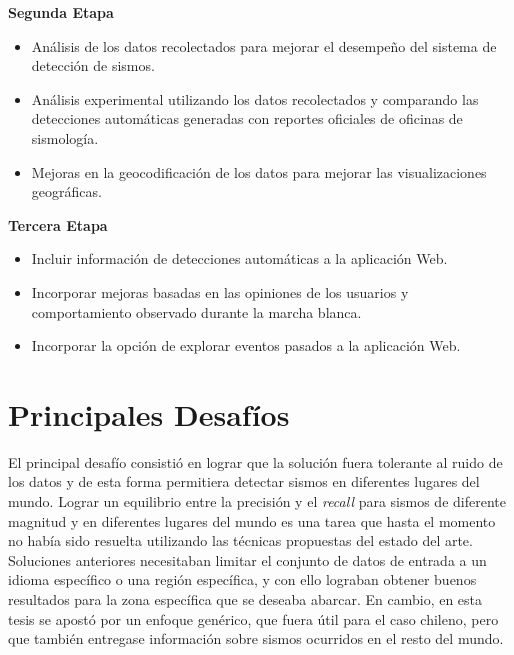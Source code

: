 \textbf{Segunda Etapa}

\begin{itemize}

\item Análisis de los datos recolectados para mejorar el desempeño del sistema de detección de sismos. 
\item Análisis experimental utilizando los datos recolectados y comparando las detecciones automáticas generadas con reportes oficiales de oficinas de sismología.
\item Mejoras en la geocodificación de los datos para mejorar las visualizaciones geográficas. 

\end{itemize}

\textbf{Tercera Etapa}

\begin{itemize}
\item Incluir información de detecciones automáticas a la aplicación Web.
\item Incorporar mejoras basadas en las opiniones de los usuarios y comportamiento observado durante la marcha blanca.
\item Incorporar la opción de explorar eventos pasados a la aplicación Web.

\end{itemize}

\section{Principales Desafíos}

El principal desafío consistió en lograr que la solución fuera tolerante al ruido de los datos y de esta forma permitiera detectar sismos en diferentes lugares del mundo. 
%
Lograr un equilibrio entre la precisión y el {\em recall} para sismos de diferente magnitud y en diferentes lugares del mundo es una tarea que hasta el momento no había sido resuelta utilizando las técnicas propuestas del estado del arte. 
%
Soluciones anteriores necesitaban limitar el conjunto de datos de entrada a un idioma específico o una región específica, y con ello lograban obtener buenos resultados para la zona específica que se deseaba abarcar. 
%
En cambio, en esta tesis se apostó por un enfoque genérico, que fuera útil para el caso chileno, pero que también entregase información sobre sismos ocurridos en el resto del mundo.


